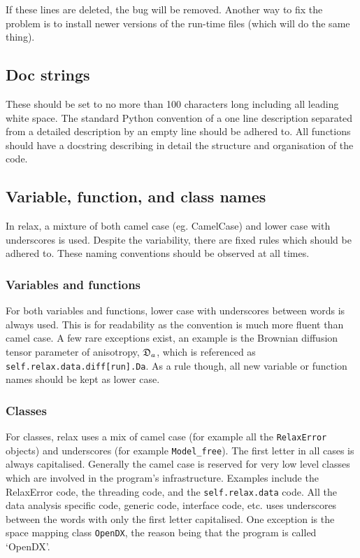 If these lines are deleted, the bug will be removed.  Another way to fix the problem is to install newer versions of the run-time files (which will do the same thing).



\subsection{Doc strings}

These should be set to no more than 100 characters long including all leading white space.  The standard Python convention of a one line description separated from a detailed description by an empty line should be adhered to.  All functions should have a docstring describing in detail the structure and organisation of the code.



\subsection{Variable, function, and class names}

In relax, a mixture of both camel case (eg. CamelCase) and lower case with underscores is used.  Despite the variability, there are fixed rules which should be adhered to.  These naming conventions should be observed at all times.


\subsubsection{Variables and functions}

For both variables and functions, lower case with underscores between words is always used.  This is for readability as the convention is much more fluent than camel case.  A few rare exceptions exist, an example is the Brownian diffusion tensor parameter of anisotropy, $\mathfrak{D}_a$, which is referenced as \texttt{self.relax.data.diff[run].Da}.  As a rule though, all new variable or function names should be kept as lower case.


\subsubsection{Classes}

For classes, relax uses a mix of camel case (for example all the \texttt{RelaxError} objects) and underscores (for example \texttt{Model\_free}).  The first letter in all cases is always capitalised.  Generally the camel case is reserved for very low level classes which are involved in the program's infrastructure.  Examples include the RelaxError code, the threading code, and the \texttt{self.relax.data} code.  All the data analysis specific code, generic code, interface code, etc. uses underscores between the words with only the first letter capitalised.  One exception is the space mapping class \texttt{OpenDX}, the reason being that the program is called `OpenDX'.



